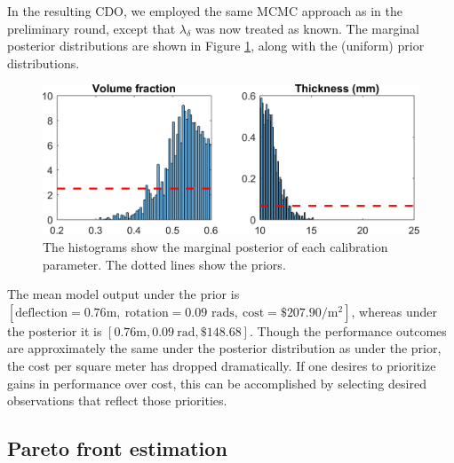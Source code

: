 \documentclass{article}
\begin{document}
In the resulting CDO, we employed the same MCMC approach as in the preliminary round, except that $\lambda_\delta$ was now treated as known.
%
The marginal posterior distributions are shown in Figure \ref{fig:wt_marg_post}, along with the (uniform) prior distributions. 
%
\begin{figure}
\centering
\includegraphics[width=.7\linewidth]{FIG_posterior_marginals_with_priors}
\captionsetup{width=.7\linewidth}
\caption{The histograms show the marginal posterior of each calibration parameter. The dotted lines show the priors.}
\label{fig:wt_marg_post}
\end{figure}
%
The mean model output under the prior is $[\text{deflection}=0.76\mathrm m,\ \text{rotation}=0.09\text{ rads},\ \text{cost}=\$207.90/\mathrm m^2]$, whereas under the posterior it is $[0.76\mathrm m,0.09\ \mathrm{rad},\$148.68]$.
%
Though the performance outcomes are approximately the same under the posterior distribution as under the prior, the cost per square meter has dropped dramatically.
%
If one desires to prioritize gains in performance over cost, this can be accomplished by selecting desired observations that reflect those priorities. 

\subsection{Pareto front estimation}\label{removing_cal_pars}

\end{document}
